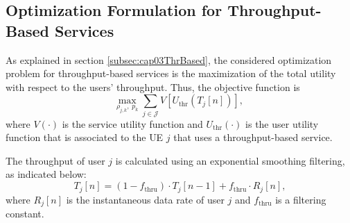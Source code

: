 \begin{apendicesenv}
	
\chapter{Optimization Formulation for Throughput-Based Services}
\label{Ap:ThrBasedOpt}

As explained in section \ref{subsec:cap03ThrBased}, the considered optimization problem for throughput-based services is the maximization of the total utility with respect to the users' throughput. Thus, the objective function is 
%
\begin{equation}
\label{JSM:Eq:Util_Opt_Joint_NRT_App}
\underset{\rho_{j,k},\;p_{k}}{\text{max}} \; \sum_{j \in \mathcal{J}} V\left[U_{\mathrm{thr}}\left(T_{j}\left[n\right]\right)\right],
\end{equation} 
%
where $V\left(\cdot\right)$ is the service utility function and $U_{\mathrm{thr}}\left(\cdot\right)$ is the user utility function that is associated to the \ac{UE} $j$ that uses a throughput-based service.

The throughput of user $j$ is calculated using an exponential smoothing filtering, as indicated below: 
%
\begin{equation}
\label{JSM:Eq:Util_Thru_Calc}
T_{j}\left[n\right] = \left(1 - f_{\mathrm{thru}}\right) \cdot T_{j}\left[n-1\right] + f_{\mathrm{thru}} \cdot R_j\left[n\right],
\end{equation} 
%
where $R_j\left[n\right]$ is the instantaneous data rate of user $j$ and $f_{\mathrm{thru}}$ is a filtering constant.


\end{apendicesenv}
